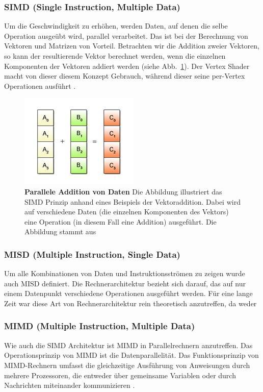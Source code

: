 \subsubsection*{SIMD (Single Instruction, Multiple Data)}
Um die Geschwindigkeit zu erhöhen, werden Daten, auf denen die selbe Operation ausgeübt wird, parallel verarbeitet.
Das ist bei der Berechnung von Vektoren und Matrizen von Vorteil.
Betrachten wir die Addition zweier Vektoren, so kann der resultierende Vektor berechnet werden, wenn die einzelnen Komponenten der Vektoren addiert werden (siehe Abb.~\ref{fig:simd_pattern}). Der Vertex Shader macht von dieser diesem Konzept Gebrauch, während dieser seine per-Vertex Operationen ausführt \cite{DalCin1996}.
\begin{figure}[htb]
  \centering  
  \includegraphics[scale=0.9]{Bilder/Simd_pattern.jpg}
  \caption[SIMD Pattern]{\textbf{Parallele Addition von Daten} Die Abbildung illustriert das SIMD Prinzip anhand eines Beispiels der Vektoraddition. Dabei wird auf verschiedene Daten (die einzelnen Komponenten des Vektors) eine Operation (in diesem Fall eine Addition) ausgeführt.
  Die Abbildung stammt aus \cite{Sony2008}}
  \label{fig:simd_pattern}
\end{figure} 
\subsubsection*{MISD (Multiple Instruction, Single Data)}
Um alle Kombinationen von Daten und Instruktionsströmen zu zeigen wurde auch MISD definiert.
Die Rechnerarchitektur bezieht sich darauf, das auf nur einem Datenpunkt verschiedene Operationen ausgeführt werden.
Für eine lange Zeit war diese Art von Rechnerarchitektur rein theoretisch anzutreffen, da weder 
\subsubsection*{MIMD (Multiple Instruction, Multiple Data)}
Wie auch die SIMD Architektur ist MIMD in Parallelrechnern anzutreffen.
Das Operationsprinzip von MIMD ist die Datenparallelität.
Das Funktionsprinzip von MIMD-Rechnern umfasst die gleichzeitige Ausführung von Anweisungen durch mehrere Prozessoren, die entweder über gemeinsame Variablen oder durch Nachrichten miteinander kommunizieren \cite{DalCin1996}. \newline

